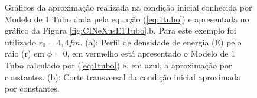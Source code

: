 \documentclass[a4paper,12pt]{article}
\begin{document}
\begin{figure}[H]
\centering

\caption{Gráficos da aproximação realizada na condição inicial conhecida por Modelo de 1 Tubo dada pela equação (\ref{eq:1tubo}) e apresentada no gráfico da Figura \ref{fig:CINeXusE1Tubo}.b. Para este exemplo foi utilizado $r_0 = 4,4 fm$. (a): Perfil de densidade de energia (E) pelo raio (r) em $\phi = 0$, em vermelho está apresentado o Modelo de 1 Tubo calculado por (\ref{eq:1tubo}) e, em azul, a aproximação por constantes. (b): Corte transversal da condição inicial aproximada por constantes.}
\label{fig:AproxModelo1Tubo}
\end{figure}
\end{document}
